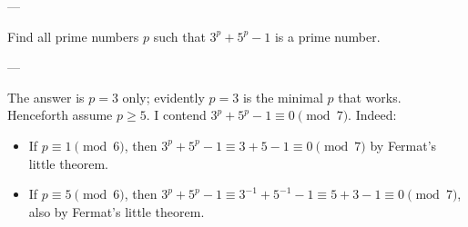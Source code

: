 
---

Find all prime numbers $p$ such that $3^p+5^p-1$ is a prime number.

---

The answer is $p=3$ only; evidently $p=3$ is the minimal $p$ that works. Henceforth assume $p\ge5$. I contend $3^p+5^p-1\equiv0\pmod7$. Indeed:
\begin{itemize}[itemsep=0em]
    \item If $p\equiv1\pmod6$, then $3^p+5^p-1\equiv3+5-1\equiv0\pmod7$ by Fermat's little theorem.
    \item If $p\equiv5\pmod6$, then $3^p+5^p-1\equiv3^{-1}+5^{-1}-1\equiv5+3-1\equiv0\pmod7$, also by Fermat's little theorem.
\end{itemize}
